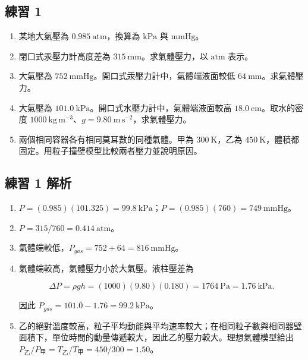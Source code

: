 \documentclass[11pt,a4paper]{article}
\providecommand{\tightlist}{%
  \setlength{\itemsep}{0pt}\setlength{\parskip}{0pt}}
\begin{document}
\subsection{練習 1}\label{ux7df4ux7fd2-1}

\begin{enumerate}
\def\labelenumi{\arabic{enumi}.}
\tightlist
\item
  某地大氣壓為 \(0.985\ \mathrm{atm}\)，換算為 \(\mathrm{kPa}\) 與 \(\mathrm{mmHg}\)。
\item
  閉口式汞壓力計高度差為 \(315\ \mathrm{mm}\)。求氣體壓力，以 \(\mathrm{atm}\) 表示。
\item
  大氣壓為 \(752\ \mathrm{mmHg}\)。開口式汞壓力計中，氣體端液面較低 \(64\ \mathrm{mm}\)。求氣體壓力。
\item
  大氣壓為 \(101.0\ \mathrm{kPa}\)。開口式水壓力計中，氣體端液面較高 \(18.0\ \mathrm{cm}\)。取水的密度 \(1000\ \mathrm{kg\,m^{-3}}\)、\(g=9.80\ \mathrm{m\,s^{-2}}\)，求氣體壓力。
\item
  兩個相同容器各有相同莫耳數的同種氣體。甲為 \(300\ \mathrm K\)，乙為 \(450\ \mathrm K\)，體積都固定。用粒子撞壁模型比較兩者壓力並說明原因。
\end{enumerate}

\subsection{練習 1 解析}\label{ux7df4ux7fd2-1-ux89e3ux6790}

\begin{enumerate}
\def\labelenumi{\arabic{enumi}.}
\item
  \(P=(0.985)(101.325)=99.8\ \mathrm{kPa}\)；\(P=(0.985)(760)=749\ \mathrm{mmHg}\)。
\item
  \(P=315/760=0.414\ \mathrm{atm}\)。
\item
  氣體端較低，\(P_{gas}=752+64=816\ \mathrm{mmHg}\)。
\item
  氣體端較高，氣體壓力小於大氣壓。液柱壓差為

  \[
  \Delta P=\rho gh=(1000)(9.80)(0.180)=1764\ \mathrm{Pa}=1.76\ \mathrm{kPa}.
  \]

  因此 \(P_{gas}=101.0-1.76=99.2\ \mathrm{kPa}\)。
\item
  乙的絕對溫度較高，粒子平均動能與平均速率較大；在相同粒子數與相同器壁面積下，單位時間的動量傳遞較大，因此乙的壓力較大。理想氣體模型給出 \(P_{\text{乙}}/P_{\text{甲}}=T_{\text{乙}}/T_{\text{甲}}=450/300=1.50\)。
\end{enumerate}
\end{document}

